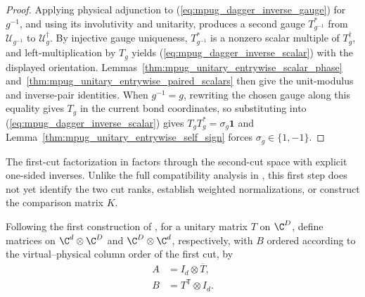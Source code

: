 \begin{proof}\leanok
    Applying physical adjunction to (\ref{eq:mpug_dagger_inverse_gauge}) for
    $g^{-1}$, and using its involutivity and unitarity, produces a second gauge
    $T_{g^{-1}}^*$ from $\mathcal U_{g^{-1}}$ to $\mathcal U_g^\dagger$. By
    injective gauge uniqueness, $T_{g^{-1}}^*$ is a nonzero scalar multiple of
    $T_g^\dagger$, and left-multiplication by $T_g$ yields
    (\ref{eq:mpug_dagger_inverse_scalar}) with the displayed orientation.
    Lemmas~\ref{thm:mpug_unitary_entrywise_scalar_phase}
    and~\ref{thm:mpug_unitary_entrywise_paired_scalars} then give the
    unit-modulus and inverse-pair identities. When $g^{-1}=g$, rewriting the
    chosen gauge along this equality gives $T_g$ in the current bond
    coordinates, so substituting into (\ref{eq:mpug_dagger_inverse_scalar})
    gives $T_gT_g^*=\sigma_g\mathbf 1$ and
    Lemma~\ref{thm:mpug_unitary_entrywise_self_sign} forces
    $\sigma_g\in\{1,-1\}$.
\end{proof}

The first-cut factorization in
\cite[lines~5390--5432]{FrancoRubio2025MPUGauging} factors through the
second-cut space with explicit one-sided inverses.
Unlike the full compatibility analysis in
\cite[lines~5342--5350]{FrancoRubio2025MPUGauging}, this first step does not
yet identify the two cut ranks, establish weighted normalizations, or construct
the comparison matrix $K$.

\begin{definition}
    \label{def:mpug_inverse_cut_gauges}
    \leanok
    Following the first construction of
    \cite[lines~5390--5432]{FrancoRubio2025MPUGauging}, for a unitary matrix
    $T$ on $\C^D$, define matrices on $\C^d\otimes\C^D$ and $\C^D\otimes\C^d$,
    respectively, with $B$ ordered according to the virtual--physical column
    order of the first cut, by
    \begin{align}
        A & =I_d\otimes\overline T,    \\
        B & =T^{\mathsf T}\otimes I_d.
    \end{align}
\end{definition}

